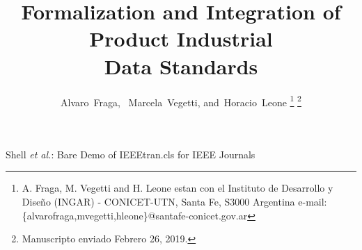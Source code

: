 \documentclass[journal]{IEEEtran}
\begin{document}
%
\title{Formalization and Integration of Product Industrial \\ Data Standards}
%
%
%

\author{Alvaro~Fraga,~
        Marcela~Vegetti,
        and~Horacio~Leone%
\thanks{A. Fraga, M. Vegetti and H. Leone estan con el Instituto de Desarrollo y Dise\~no (INGAR) - CONICET-UTN, Santa Fe, S3000 Argentina   e-mail: \{alvarofraga,mvegetti,hleone\}@santafe-conicet.gov.ar }
\thanks{Manuscripto enviado Febrero 26, 2019.}}

% 
%



%
{Shell \MakeLowercase{\textit{et al.}}: Bare Demo of IEEEtran.cls for IEEE Journals}
% 
\end{document}
